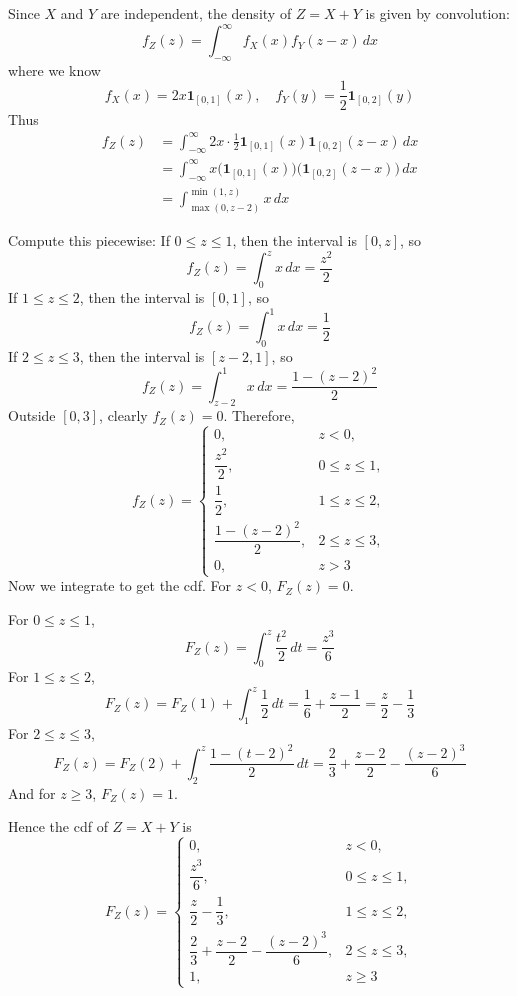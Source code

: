 \begin{solution}

Since $X$ and $Y$ are independent, the density of
\(
Z=X+Y
\)
is given by convolution:
\[
f_Z(z)=\int_{-\infty}^{\infty} f_X(x)f_Y(z-x)\,dx
\]
where we know 
\[
f_X(x)=2x \mathbf{1}_{[0,1]}(x), \quad f_Y(y)=\frac12 \mathbf{1}_{[0,2]}(y)
\]
Thus
\begin{align*}
f_Z(z)
&=\int_{-\infty}^{\infty} 2x \cdot \frac12 
\mathbf{1}_{[0,1]}(x)\mathbf{1}_{[0,2]}(z-x)\,dx\\
&=\int_{-\infty}^{\infty}x  \bigg(\mathbf{1}_{[0,1]}(x)\bigg)  \bigg( \mathbf{1}_{[0,2]}(z-x)\bigg)   \,dx\\
&=\int_{\max(0,z-2)}^{\min(1,z)} x\,dx
\end{align*}

Compute this piecewise:
If $0\le z\le 1$, then the interval is $[0,z]$, so
\[
f_Z(z)=\int_0^z x\,dx=\frac{z^2}{2}
\]
If $1\le z\le 2$, then the interval is $[0,1]$, so
\[
f_Z(z)=\int_0^1 x\,dx=\frac12
\]
If $2\le z\le 3$, then the interval is $[z-2,1]$, so
\[
f_Z(z)=\int_{z-2}^1 x\,dx
=\frac{1-(z-2)^2}{2}
\]
Outside $[0,3]$, clearly $f_Z(z)=0$.
Therefore,
\[
f_Z(z)=
\begin{cases}
0, & z<0,\\
\dfrac{z^2}{2}, & 0\le z\le 1,\\
\dfrac12, & 1\le z\le 2,\\
\dfrac{1-(z-2)^2}{2}, & 2\le z\le 3,\\
0, & z>3
\end{cases}
\]
Now we integrate to get the cdf.
For $z<0$, $F_Z(z)=0$.

For $0\le z\le 1$,
\[
F_Z(z)=\int_0^z \frac{t^2}{2}\,dt=\frac{z^3}{6}
\]
For $1\le z\le 2$,
\[
F_Z(z)=F_Z(1)+\int_1^z \frac12\,dt
=\frac16+\frac{z-1}{2}
=\frac{z}{2}-\frac13
\]
For $2\le z\le 3$,
\[
F_Z(z)=F_Z(2)+\int_2^z \frac{1-(t-2)^2}{2}\,dt = \frac23+\frac{z-2}{2}-\frac{(z-2)^3}{6}
\]
And for $z\ge 3$, $F_Z(z)=1$.

Hence the cdf of $Z=X+Y$ is
\[
F_Z(z)=
\begin{cases}
0, & z<0,\\
\dfrac{z^3}{6}, & 0\le z\le 1,\\
\dfrac{z}{2}-\dfrac13, & 1\le z\le 2,\\
\dfrac23+\dfrac{z-2}{2}-\dfrac{(z-2)^3}{6}, & 2\le z\le 3,\\
1, & z\ge 3
\end{cases}
\]
\end{solution}


